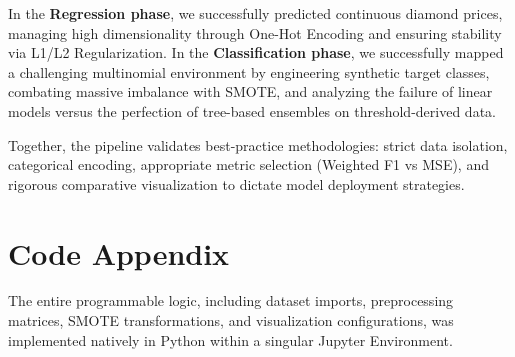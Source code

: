 \documentclass[12pt, a4paper]{article}
\begin{document}
In the \textbf{Regression phase}, we successfully predicted continuous diamond prices, managing high dimensionality through One-Hot Encoding and ensuring stability via L1/L2 Regularization. In the \textbf{Classification phase}, we successfully mapped a challenging multinomial environment by engineering synthetic target classes, combating massive imbalance with SMOTE, and analyzing the failure of linear models versus the perfection of tree-based ensembles on threshold-derived data.

Together, the pipeline validates best-practice methodologies: strict data isolation, categorical encoding, appropriate metric selection (Weighted F1 vs MSE), and rigorous comparative visualization to dictate model deployment strategies.

\newpage
\section{Code Appendix}
The entire programmable logic, including dataset imports, preprocessing matrices, SMOTE transformations, and visualization configurations, was implemented natively in Python within a singular Jupyter Environment.

\end{document}
